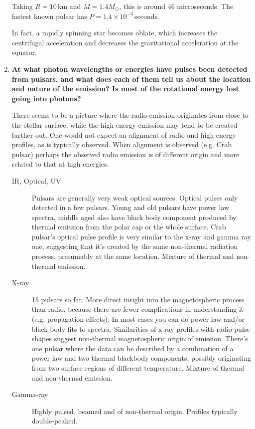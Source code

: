 \documentclass[a4paper]{article}
\begin{document}
\begin{enumerate}
Taking $ R = 10\,$km and $M = 1.4 M_\odot$, this is around 46 microseconds. The fastest known pulsar has $P = 1.4 \times 10^{-3}\,$seconds.

In fact, a rapidly spinning star becomes oblate, which increases the centrifugal acceleration and decreases the gravitational acceleration at the equator.

\item \textbf{At what photon wavelengths or energies have pulses been detected from pulsars, and what does each of them tell us about the location and nature of the emission? Is most of the rotational energy lost going into photons?}

There seems to be a picture where the radio emission originates from close to the stellar surface, while the high-energy emission may tend to be created further out. One would not expect an alignment of radio and high-energy profiles, as is typically observed. When alignment is observed (e.g. Crab pulsar) perhaps the observed radio emission is of different origin and more related to that at high energies. 

\begin{description}

\item[IR, Optical, UV] Pulsars are generally very weak optical sources. Optical pulses only detected in a few pulsars. Young and old pulsars have power law spectra, middle aged also have black body component produced by thermal emission from the polar cap or the whole surface. Crab pulsar's optical pulse profile is very similar to the x-ray and gamma ray one, suggesting that it's created by the same non-thermal radiation process, presumably at the same location. Mixture of thermal and non-thermal emission. 

\item[X-ray] 15 pulsars so far. More direct insight into the magnetospheric process than radio, because there are fewer complications in understanding it (e.g. propagation effects). In most cases you can do power law and/or black body fits to spectra. Similarities of x-ray profiles with radio pulse shapes suggest non-thermal magnetospheric origin of emission. There's one pulsar where the data can be described by a combination of a power law and two thermal blackbody components, possibly originating from two surface regions of different temperature. Mixture of thermal and non-thermal emission. 

\item[Gamma-ray] Highly pulsed, beamed and of non-thermal origin. Profiles typically double-peaked. 


\end{description}
\end{enumerate}
\end{document}
